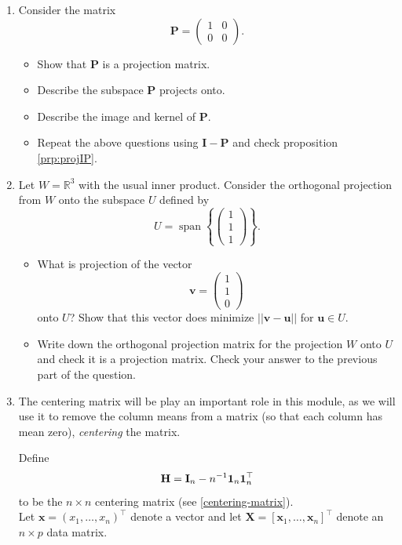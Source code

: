 \documentclass[]{book}
\providecommand{\tightlist}{%
  \setlength{\itemsep}{0pt}\setlength{\parskip}{0pt}}
\theoremstyle{definition}
\theoremstyle{definition}
\theoremstyle{definition}
\theoremstyle{remark}
\begin{document}
\begin{enumerate}
\def\labelenumi{\arabic{enumi}.}
\setcounter{enumi}{4}
\item
  Consider the matrix \[\mathbf P=\left( \begin{array}{cc}1&0\\
  0&0\end{array}\right).\]

  \begin{itemize}
  \tightlist
  \item
    Show that \(\mathbf P\) is a projection matrix.
  \item
    Describe the subspace \(\mathbf P\) projects onto.
  \item
    Describe the image and kernel of \(\mathbf P\).
  \item
    Repeat the above questions using \(\mathbf I-\mathbf P\) and check proposition \ref{prp:projIP}.
  \end{itemize}
\item
  Let \(W=\mathbb{R}^3\) with the usual inner product.
  Consider the orthogonal projection from \(W\) onto the subspace \(U\) defined by
  \[U=\operatorname{span}\left\{\left(\begin{array}{c} 1\\1\\1\end{array}\right)\right\}.\]

  \begin{itemize}
  \tightlist
  \item
    What is projection of the vector \[\mathbf v=\left(\begin{array}{c} 1\\1\\0\end{array}\right)\]
    onto \(U\)? Show that this vector does minimize \(||\mathbf v-\mathbf u||\) for \(\mathbf u\in U\).
  \item
    Write down the orthogonal projection matrix for the projection \(W\) onto \(U\) and check it is a projection matrix. Check your answer to the previous part of the question.
  \end{itemize}
\item
  The centering matrix will be play an important role in this module, as we will use it to remove the column means from a matrix (so that each column has mean zero), \emph{centering} the matrix.

  Define \[\mathbf H=\mathbf I_n - n^{-1}{\bf 1}_n {\bf 1}_n^\top\] to be the \(n \times n\) centering matrix (see \ref{centering-matrix}).\\
  Let \(\mathbf x=(x_1, \ldots , x_n)^\top\) denote a vector and let \(\mathbf X=[\mathbf x_1 ,\ldots , \mathbf x_n]^\top\) denote an \(n \times p\) data matrix.


\end{enumerate}
\end{document}
